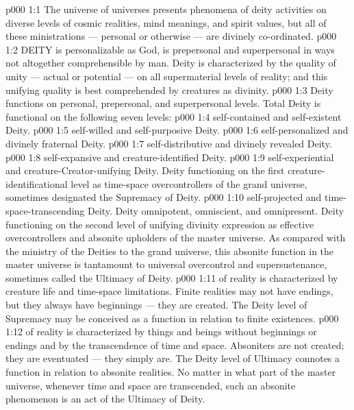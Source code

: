 \vs p000 1:1 The universe of universes presents phenomena of deity activities on diverse levels of cosmic realities, mind meanings, and spirit values, but all of these ministrations --- personal or otherwise --- are divinely co\hyp{}ordinated.
\vs p000 1:2 \pc DEITY is personalizable as God, is prepersonal and superpersonal in ways not altogether comprehensible by man. Deity is characterized by the quality of unity --- actual or potential --- on all supermaterial levels of reality; and this unifying quality is best comprehended by creatures as divinity.
\vs p000 1:3 \pc Deity functions on personal, prepersonal, and superpersonal levels. Total Deity is functional on the following seven levels:
\vs p000 1:4 \bibnobreakspace {} self\hyp{}contained and self\hyp{}existent Deity.
\vs p000 1:5 \bibnobreakspace {} self\hyp{}willed and self\hyp{}purposive Deity.
\vs p000 1:6 \bibnobreakspace {} self\hyp{}personalized and divinely fraternal Deity.
\vs p000 1:7 \bibnobreakspace {} self\hyp{}distributive and divinely revealed Deity.
\vs p000 1:8 \bibnobreakspace {} self\hyp{}expansive and creature\hyp{}identified Deity.
\vs p000 1:9 \bibnobreakspace {} self\hyp{}experiential and creature\hyp{}Creator\hyp{}unifying Deity. Deity functioning on the first creature\hyp{}identificational level as time\hyp{}space overcontrollers of the grand universe, sometimes designated the Supremacy of Deity.
\vs p000 1:10 \bibnobreakspace {} self\hyp{}projected and time\hyp{}space\hyp{}transcending Deity. Deity omnipotent, omniscient, and omnipresent. Deity functioning on the second level of unifying divinity expression as effective overcontrollers and absonite upholders of the master universe. As compared with the ministry of the Deities to the grand universe, this absonite function in the master universe is tantamount to universal overcontrol and supersustenance, sometimes called the Ultimacy of Deity.
\vs p000 1:11 \pc {} of reality is characterized by creature life and time\hyp{}space limitations. Finite realities may not have endings, but they always have beginnings --- they are created. The Deity level of Supremacy may be conceived as a function in relation to finite existences.
\vs p000 1:12 \pc {} of reality is characterized by things and beings without beginnings or endings and by the transcendence of time and space. Absoniters are not created; they are eventuated --- they simply are. The Deity level of Ultimacy connotes a function in relation to absonite realities. No matter in what part of the master universe, whenever time and space are transcended, such an absonite phenomenon is an act of the Ultimacy of Deity.

